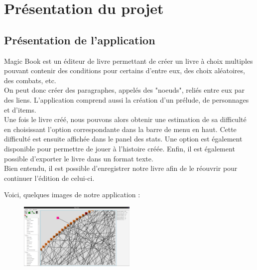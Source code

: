 \chapter{Présentation du projet}

	\section{Présentation de l'application}
        Magic Book est un éditeur de livre permettant de créer un livre à choix multiples pouvant contenir des conditions pour certains d'entre eux, des choix aléatoires, des combats, etc.\\
        On peut donc créer des paragraphes, appelés des "noeuds", reliés entre eux par des liens. L'application comprend aussi la création d'un prélude, de personnages et d'items.\\
        Une fois le livre créé, nous pouvons alors obtenir une estimation de sa difficulté en choisissant l'option correspondante dans la barre de menu en haut. Cette difficulté est ensuite affichée dans le panel des stats. Une option est également disponible pour permettre de jouer à l'histoire créée. Enfin, il est également possible d'exporter le livre dans un format texte.\\
        Bien entendu, il est possible d'enregistrer notre livre afin de le réouvrir pour continuer l'édition de celui-ci.

		\noindent Voici, quelques images de notre application :

		\begin{figure}[H]
			\centering\includegraphics[width=0.5\textwidth]{img/editeur.png}
		\end{figure}

